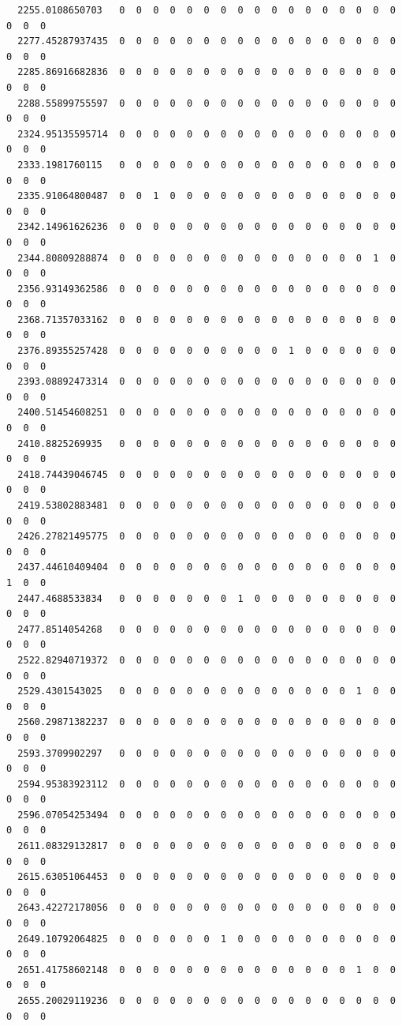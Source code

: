 \documentclass[
  letterpaper,
  DIV=11,
  numbers=noendperiod]{scrartcl}
\begin{document}
\begin{verbatim}
  2255.0108650703   0  0  0  0  0  0  0  0  0  0  0  0  0  0  0  0  0  0  0  0
  2277.45287937435  0  0  0  0  0  0  0  0  0  0  0  0  0  0  0  0  0  0  0  0
  2285.86916682836  0  0  0  0  0  0  0  0  0  0  0  0  0  0  0  0  0  0  0  0
  2288.55899755597  0  0  0  0  0  0  0  0  0  0  0  0  0  0  0  0  0  0  0  0
  2324.95135595714  0  0  0  0  0  0  0  0  0  0  0  0  0  0  0  0  0  0  0  0
  2333.1981760115   0  0  0  0  0  0  0  0  0  0  0  0  0  0  0  0  0  0  0  0
  2335.91064800487  0  0  1  0  0  0  0  0  0  0  0  0  0  0  0  0  0  0  0  0
  2342.14961626236  0  0  0  0  0  0  0  0  0  0  0  0  0  0  0  0  0  0  0  0
  2344.80809288874  0  0  0  0  0  0  0  0  0  0  0  0  0  0  0  1  0  0  0  0
  2356.93149362586  0  0  0  0  0  0  0  0  0  0  0  0  0  0  0  0  0  0  0  0
  2368.71357033162  0  0  0  0  0  0  0  0  0  0  0  0  0  0  0  0  0  0  0  0
  2376.89355257428  0  0  0  0  0  0  0  0  0  0  1  0  0  0  0  0  0  0  0  0
  2393.08892473314  0  0  0  0  0  0  0  0  0  0  0  0  0  0  0  0  0  0  0  0
  2400.51454608251  0  0  0  0  0  0  0  0  0  0  0  0  0  0  0  0  0  0  0  0
  2410.8825269935   0  0  0  0  0  0  0  0  0  0  0  0  0  0  0  0  0  0  0  0
  2418.74439046745  0  0  0  0  0  0  0  0  0  0  0  0  0  0  0  0  0  0  0  0
  2419.53802883481  0  0  0  0  0  0  0  0  0  0  0  0  0  0  0  0  0  0  0  0
  2426.27821495775  0  0  0  0  0  0  0  0  0  0  0  0  0  0  0  0  0  0  0  0
  2437.44610409404  0  0  0  0  0  0  0  0  0  0  0  0  0  0  0  0  0  1  0  0
  2447.4688533834   0  0  0  0  0  0  0  1  0  0  0  0  0  0  0  0  0  0  0  0
  2477.8514054268   0  0  0  0  0  0  0  0  0  0  0  0  0  0  0  0  0  0  0  0
  2522.82940719372  0  0  0  0  0  0  0  0  0  0  0  0  0  0  0  0  0  0  0  0
  2529.4301543025   0  0  0  0  0  0  0  0  0  0  0  0  0  0  1  0  0  0  0  0
  2560.29871382237  0  0  0  0  0  0  0  0  0  0  0  0  0  0  0  0  0  0  0  0
  2593.3709902297   0  0  0  0  0  0  0  0  0  0  0  0  0  0  0  0  0  0  0  0
  2594.95383923112  0  0  0  0  0  0  0  0  0  0  0  0  0  0  0  0  0  0  0  0
  2596.07054253494  0  0  0  0  0  0  0  0  0  0  0  0  0  0  0  0  0  0  0  0
  2611.08329132817  0  0  0  0  0  0  0  0  0  0  0  0  0  0  0  0  0  0  0  0
  2615.63051064453  0  0  0  0  0  0  0  0  0  0  0  0  0  0  0  0  0  0  0  0
  2643.42272178056  0  0  0  0  0  0  0  0  0  0  0  0  0  0  0  0  0  0  0  0
  2649.10792064825  0  0  0  0  0  0  1  0  0  0  0  0  0  0  0  0  0  0  0  0
  2651.41758602148  0  0  0  0  0  0  0  0  0  0  0  0  0  0  1  0  0  0  0  0
  2655.20029119236  0  0  0  0  0  0  0  0  0  0  0  0  0  0  0  0  0  0  0  0

\end{verbatim}
\end{document}
